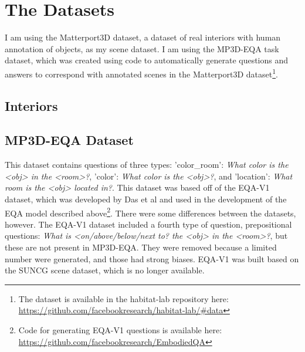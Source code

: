 

\section{The Datasets}
I am using the Matterport3D dataset, a dataset of real interiors with human annotation of objects, as my scene dataset\cite{matterport}. 
I am using the MP3D-EQA task dataset, which was created using code to automatically generate questions and answers to correspond with annotated scenes in the Matterport3D dataset\footnote{The dataset is available in the habitat-lab repository here: \url{https://github.com/facebookresearch/habitat-lab/#data}}\cite{eqa_matterport}. 


\subsection{Interiors}

\subsection{MP3D-EQA Dataset} 
This dataset contains questions of three types: 'color\_room': \emph{What color is the <obj> in the <room>?}, 'color': \emph{What color is the <obj>?}, and 'location': \emph{What room is the <obj> located in?}. This dataset was based off of the EQA-V1 dataset, which was developed by Das et al and used in the development of the EQA model described above\footnote{Code for generating EQA-V1 questions is available here: \url{https://github.com/facebookresearch/EmbodiedQA}}\cite{embodiedqa}. There were some differences between the datasets, however. The EQA-V1 dataset included a fourth type of question, prepositional questions: \emph{What is <on/above/below/next to? the <obj> in the <room>?}, but these are not present in MP3D-EQA. They were removed because a limited number were generated, and those had strong biases. %
EQA-V1 was built based on the SUNCG scene dataset, which is no longer available. %

